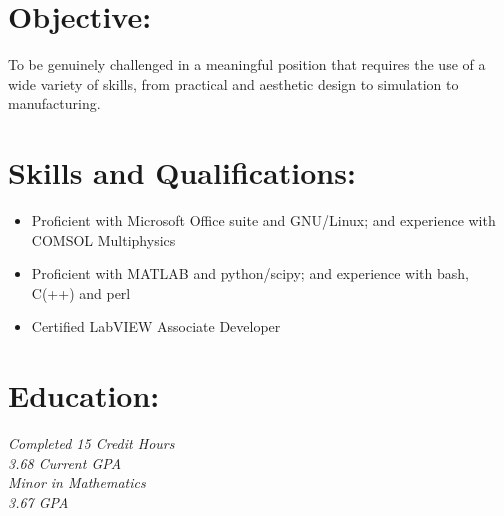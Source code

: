 \documentclass{resume}
\author{Joshua Holbrook}
\begin{document}
\maketitle

\section{Objective:}

\small To be genuinely challenged in a meaningful position that requires the use of a wide variety of skills, from practical and aesthetic design to simulation to manufacturing.\normalsize


\section{Skills and Qualifications:}
\small\begin{itemize}
\item Proficient with Microsoft Office suite and GNU/Linux; and experience with COMSOL Multiphysics
\item Proficient with MATLAB and python/scipy; and experience with bash, C(++) and perl
\item Certified LabVIEW Associate Developer
\end{itemize}\normalsize

\section{Education:}

\emph{Completed 15 Credit Hours}\\
\emph{3.68 Current GPA}\\

\textit{Minor in Mathematics}\\
\textit{3.67 GPA}
\end{document}
